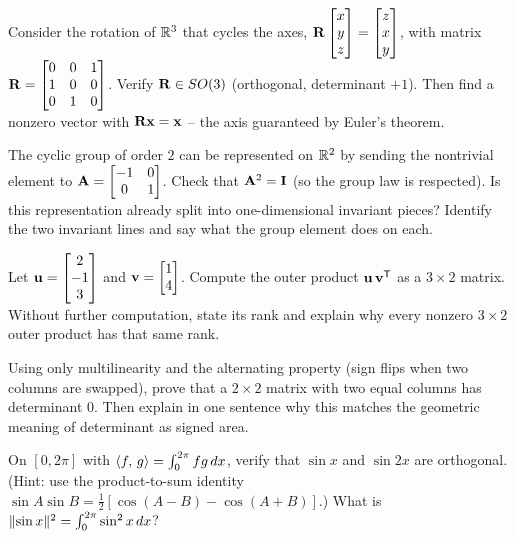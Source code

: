 \begin{exercise}
\label{ch37:ex-euler}
Consider the rotation of $\mathbb{R}^3$ that cycles the axes, $\mathbf{R}\begin{bmatrix}x\\y\\z\end{bmatrix}
=\begin{bmatrix}z\\x\\y\end{bmatrix}$, with matrix
$\mathbf{R}=\begin{bmatrix}0&0&1\\1&0&0\\0&1&0\end{bmatrix}$. Verify $\mathbf{R}\in SO(3)$
(orthogonal, determinant $+1$). Then find a nonzero vector with $\mathbf{R}\mathbf{x}
=\mathbf{x}$ -- the axis guaranteed by Euler's theorem.
\end{exercise}

\begin{exercise}
\label{ch37:ex-reptwo}
The cyclic group of order $2$ can be represented on $\mathbb{R}^2$ by sending the nontrivial
element to $\mathbf{A}=\begin{bmatrix}-1&0\\0&1\end{bmatrix}$. Check that $\mathbf{A}^2
=\mathbf{I}$ (so the group law is respected). Is this representation already split into
one-dimensional invariant pieces? Identify the two invariant lines and say what the
group element does on each.
\end{exercise}

\begin{exercise}
\label{ch37:ex-outer}
Let $\mathbf{u}=\begin{bmatrix}2\\-1\\3\end{bmatrix}$ and $\mathbf{v}=\begin{bmatrix}1\\4\end{bmatrix}$. Compute the outer
product $\mathbf{u}\,\mathbf{v}^{\mathsf{T}}$ as a $3\times 2$ matrix. Without further computation,
state its rank and explain why every nonzero $3\times 2$ outer product has that same rank.
\end{exercise}

\begin{exercise}
\label{ch37:ex-altdet}
Using only multilinearity and the alternating property (sign flips when two columns
are swapped), prove that a $2\times 2$ matrix with two equal columns has determinant
$0$. Then explain in one sentence why this matches the geometric meaning of
determinant as signed area.
\end{exercise}

\begin{exercise}
\label{ch37:ex-orthfun2}
On $[0,2\pi]$ with $\langle f,\, g \rangle=\int_0^{2\pi}fg\,dx$, verify that $\sin x$ and
$\sin 2x$ are orthogonal. (Hint: use the product-to-sum identity $\sin A\sin B
=\tfrac12[\cos(A-B)-\cos(A+B)]$.) What is $\lVert\sin x\rVert^2=\int_0^{2\pi}\sin^2 x\,dx$?
\end{exercise}


